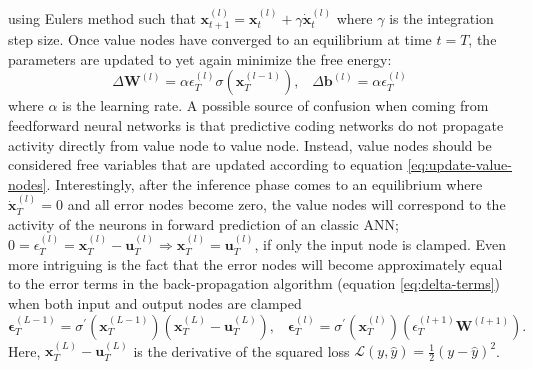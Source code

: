 \documentclass[a4paper,11pt]{article} %
\begin{document}
using Eulers method such that $\mathbf{x}_{t+1}^{(l)} = \mathbf{x}_{t}^{(l)} + \gamma \dot{\mathbf{x}}_t^{(l)}$ where $\gamma$ is the integration step size. Once value nodes have converged to an equilibrium at time $t=T$, the parameters are updated to yet again minimize the free energy:
\begin{equation} \label{eq:il-weight-update}
  \Delta \mathbf{W}^{(l)} = \alpha \epsilon_T^{(l)} \sigma(\mathbf{x}_T^{(l-1)}), \hspace{10pt} \Delta \mathbf{b}^{(l)} = \alpha \epsilon_T^{(l)}
\end{equation}
where $\alpha$ is the learning rate. A possible source of confusion when coming from feedforward neural networks is that predictive coding networks do not propagate activity directly from value node to value node. Instead, value nodes should be considered free variables that are updated according to equation \ref{eq:update-value-nodes}. Interestingly, after the inference phase comes to an equilibrium where $\dot{\mathbf{x}}_T^{(l)} = 0$ and all error nodes become zero, the value nodes will correspond to the activity of the neurons in forward prediction of an classic ANN; $0 = \epsilon_{T}^{(l)}=\mathbf{x}_{T}^{(l)}-\mathbf{u}_{T}^{(l)}  \Rightarrow \mathbf{x}_{T}^{(l)} = \mathbf{u}_{T}^{(l)}$, if only the input node is clamped. Even more intriguing is the fact that the error nodes will become approximately equal to the error terms in the back-propagation algorithm (equation \ref{eq:delta-terms}) when both input and output nodes are clamped 
\begin{equation}
    \mathbf{\epsilon}_T^{(L-1)} = \sigma^{\prime}(\mathbf{x}_{T}^{(L-1)})\left(\mathbf{x}_{T}^{(L)} - \mathbf{u}_T^{(L)} \right), \hspace{10pt} \mathbf{\epsilon}_T^{(l)} = \sigma^{\prime}(\mathbf{x}_{T}^{(l)})\left(\epsilon_{T}^{(l+1)} \mathbf{W}^{(l+1)}\right).
\end{equation}
Here, $\mathbf{x}_{T}^{(L)} - \mathbf{u}_T^{(L)}$ is the derivative of the squared loss $\mathcal{L}(y, \hat{y}) = \frac{1}{2}\left( y - \hat{y}  \right)^2$. 
\end{document}
